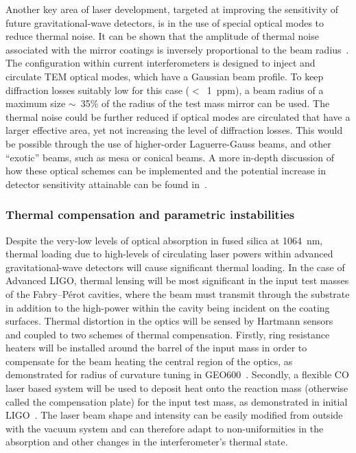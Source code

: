Another key area of laser development, targeted at improving the sensitivity of
future gravitational-wave detectors, is in the use of special optical modes to reduce thermal noise. It can be shown that the amplitude of thermal
noise associated with the mirror coatings is inversely proportional to the beam
radius~\cite{Nakagawa:2002}. The configuration within current interferometers is
designed to inject and circulate TEM optical modes, which have a
Gaussian beam profile.  To keep diffraction losses suitably low for this case
($<$~1~ppm), a beam radius of a maximum size $\sim$~35\% of the radius of the test mass
mirror can be used. The thermal noise could be further reduced if optical modes
are circulated that have a larger effective area, yet not increasing the level
of diffraction losses. This would be possible through the use of higher-order
Laguerre-Gauss beams, and other ``exotic'' beams, such as mesa or conical beams.
A more in-depth discussion of how these optical schemes can be implemented and
the potential increase in detector sensitivity attainable can be found
in~\cite{Vinet:2009}.


\subsubsection{Thermal compensation and parametric instabilities}
\label{subsubsection:thermalcomp} 

Despite the very-low levels of optical absorption in fused silica at 1064~nm,
thermal loading due to high-levels of circulating laser powers within
advanced gravitational-wave detectors will cause significant thermal loading. In
the case of Advanced LIGO, thermal lensing will be most significant in the input
test masses of the Fabry--P\'{e}rot cavities, where the beam must transmit through the
substrate in addition to the high-power within the cavity being incident on the
coating surfaces. Thermal distortion in the optics will be sensed by Hartmann
sensors and coupled to two schemes of thermal compensation. Firstly, ring
resistance heaters will be installed around the barrel of the input mass in
order to compensate for the beam heating the central region of the optics, as
demonstrated for radius of curvature tuning in GEO600~\cite{Luck:2004}.
Secondly, a flexible CO laser based system will be used to deposit heat onto
the reaction mass (otherwise called the compensation plate) for the input test
mass, as demonstrated in initial LIGO~\cite{Lawrence:2002,Waldman:2006}. The
laser beam shape and intensity can be easily modified from outside with the vacuum
system and can therefore adapt to non-uniformities in the absorption and other
changes in the interferometer's thermal state.


